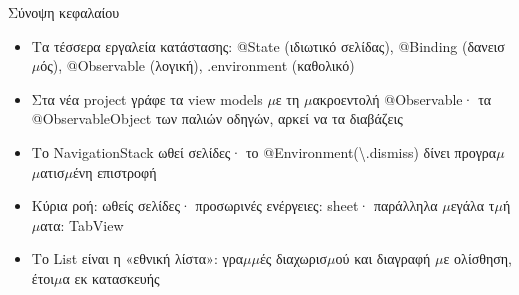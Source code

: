 \begin{tcbsummary}{Σύνοψη κεφαλαίου}
\begin{itemize}
  \item Τα τέσσερα εργαλεία κατάστασης: @State (ιδιωτικό σελίδας), @Binding (δανεισ$\mu$ός), @Observable (λογική), .environment (καθολικό)
  \item Στα νέα project γράφε τα view models $\mu$ε τη $\mu$ακροεντολή @Observable· τα @ObservableObject των παλιών οδηγών, αρκεί να τα διαβάζεις
  \item Το NavigationStack ωθεί σελίδες· το @Environment(\textbackslash{}.dismiss) δίνει προγρα$\mu$$\mu$ατισ$\mu$ένη επιστροφή
  \item Κύρια ροή: ωθείς σελίδες· προσωρινές ενέργειες: sheet· παράλληλα $\mu$εγάλα τ$\mu$ή$\mu$ατα: TabView
  \item Το List είναι η «εθνική λίστα»: γρα$\mu$$\mu$ές διαχωρισ$\mu$ού και διαγραφή $\mu$ε ολίσθηση, έτοι$\mu$α εκ κατασκευής
\end{itemize}

\end{tcbsummary}
